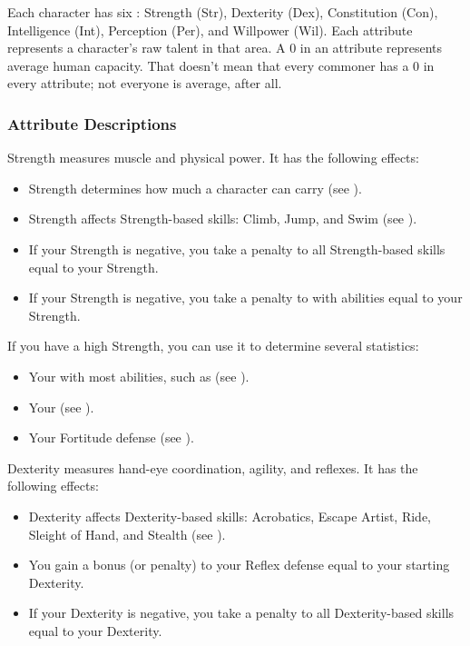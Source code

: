         Each character has six : Strength (Str), Dexterity (Dex), Constitution (Con), Intelligence (Int), Perception (Per), and Willpower (Wil).
        Each attribute represents a character's raw talent in that area.
        A 0 in an attribute represents average human capacity.
        That doesn't mean that every commoner has a 0 in every attribute; not everyone is average, after all.

        \subsubsection{Attribute Descriptions}

            \label{Strength}
                Strength measures muscle and physical power.
                It has the following effects:
                \begin{itemize}
                    \item Strength determines how much a character can carry (see ).
                    \item Strength affects Strength-based skills: Climb, Jump, and Swim (see ).
                    \item If your Strength is negative, you take a penalty to all Strength-based skills equal to your Strength.
                    \item If your Strength is negative, you take a penalty to  with  abilities equal to your Strength.
                \end{itemize}

                If you have a high Strength, you can use it to determine several statistics:
                \begin{itemize}
                    \item Your  with most  abilities, such as  (see ).
                    \item Your  (see ).
                    \item Your Fortitude defense (see ).
                \end{itemize}

            \label{Dexterity}
                Dexterity measures hand-eye coordination, agility, and reflexes.
                It has the following effects:
                \begin{itemize}
                    \item Dexterity affects Dexterity-based skills: Acrobatics, Escape Artist, Ride, Sleight of Hand, and Stealth (see ).
                    \item You gain a bonus (or penalty) to your Reflex defense equal to your starting Dexterity.
                    \item If your Dexterity is negative, you take a penalty to all Dexterity-based skills equal to your Dexterity.
                \end{itemize}


